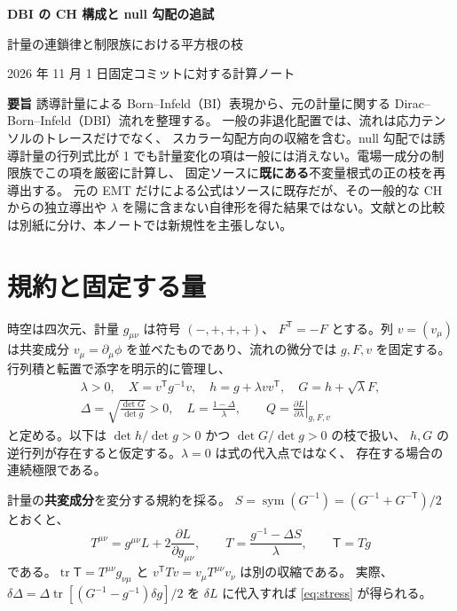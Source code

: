 \documentclass[11pt,a4paper]{article}
\newcommand{\tr}{\operatorname{tr}}
\newcommand{\sym}{\operatorname{sym}}
\newcommand{\Tmix}{\mathsf{T}}
\begin{document}
\begin{center}
{\Large\bfseries DBI の CH 構成と null 勾配の追試}\par
\vspace{5pt}
{\large 計量の連鎖律と制限族における平方根の枝}\par
\vspace{5pt}
2026 年 11 月 1 日\quad 固定コミットに対する計算ノート
\end{center}
\vspace{3pt}
\noindent\textbf{要旨}\quad
誘導計量による Born--Infeld（BI）表現から、元の計量に関する
Dirac--Born--Infeld（DBI）流れを整理する。
一般の非退化配置では、流れは応力テンソルのトレースだけでなく、
スカラー勾配方向の収縮を含む。null 勾配では誘導計量の行列式比が
1 でも計量変化の項は一般には消えない。電場一成分の制限族でこの項を厳密に計算し、
固定ソースに\textbf{既にある}不変量根式の正の枝を再導出する。
元の EMT だけによる公式はソースに既存だが、その一般的な CH からの独立導出や
$\lambda$ を陽に含まない自律形を得た結果ではない。文献との比較は別紙に分け、本ノートでは新規性を主張しない。

\section{規約と固定する量}
時空は四次元、計量 $g_{\mu\nu}$ は符号 $(-,+,+,+)$、
$F^{\mathsf T}=-F$ とする。列 $v=(v_\mu)$ は共変成分
$v_\mu=\partial_\mu\phi$ を並べたものであり、流れの微分では
$g,F,v$ を固定する。行列積と転置で添字を明示的に管理し、
\begin{equation}\label{eq:definition}
\begin{gathered}
\lambda>0,\quad X=v^{\mathsf T}g^{-1}v,\quad
h=g+\lambda vv^{\mathsf T},\quad G=h+\sqrt\lambda F,\\
\Delta=\sqrt{\frac{\det G}{\det g}}>0,\quad
L=\frac{1-\Delta}{\lambda},\qquad
Q=\left.\frac{\partial L}{\partial\lambda}\right|_{g,F,v}
\end{gathered}
\end{equation}
と定める。以下は $\det h/\det g>0$ かつ $\det G/\det g>0$ の枝で扱い、
$h,G$ の逆行列が存在すると仮定する。$\lambda=0$ は式の代入点ではなく、
存在する場合の連続極限である。

計量の\textbf{共変成分}を変分する規約を採る。
$S=\sym(G^{-1})=(G^{-1}+G^{-\mathsf T})/2$ とおくと、
\begin{equation}\label{eq:stress}
T^{\mu\nu}=g^{\mu\nu}L+2\frac{\partial L}{\partial g_{\mu\nu}},
\qquad T=\frac{g^{-1}-\Delta S}{\lambda},\qquad
\Tmix=Tg
\end{equation}
である。$\tr\Tmix=T^{\mu\nu}g_{\nu\mu}$ と
$v^{\mathsf T}Tv=v_\mu T^{\mu\nu}v_\nu$ は別の収縮である。
実際、$\delta\Delta=\Delta\tr[(G^{-1}-g^{-1})\delta g]/2$ を
$\delta L$ に代入すれば \eqref{eq:stress} が得られる。
\end{document}
